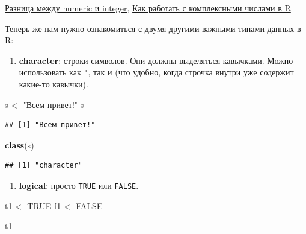 \documentclass[]{book}
\newenvironment{Shaded}{\begin{snugshade}}{\end{snugshade}}
\newcommand{\KeywordTok}[1]{\textcolor[rgb]{0.13,0.29,0.53}{\textbf{#1}}}
\newcommand{\StringTok}[1]{\textcolor[rgb]{0.31,0.60,0.02}{#1}}
\newcommand{\OtherTok}[1]{\textcolor[rgb]{0.56,0.35,0.01}{#1}}
\newcommand{\NormalTok}[1]{#1}
\providecommand{\tightlist}{%
  \setlength{\itemsep}{0pt}\setlength{\parskip}{0pt}}
\begin{document}
\href{https://stackoverflow.com/questions/23660094/whats-the-difference-between-integer-class-and-numeric-class-in-r}{Разница
между numeric и integer},
\href{http://www.r-tutor.com/r-introduction/basic-data-types/complex}{Как
работать с комплексными числами в R}

Теперь же нам нужно ознакомиться с двумя другими важными типами данных в
R:

\begin{enumerate}
\def\labelenumi{\arabic{enumi}.}
\tightlist
\item
  \textbf{character}: строки символов. Они должны выделяться кавычками.
  Можно использовать как \texttt{"}, так и \texttt{\textquotesingle{}}
  (что удобно, когда строчка внутри уже содержит какие-то кавычки).
\end{enumerate}

\begin{Shaded}
\begin{Highlighting}[]
\NormalTok{s <-}\StringTok{ "Всем привет!"}
\NormalTok{s}
\end{Highlighting}
\end{Shaded}

\begin{verbatim}
## [1] "Всем привет!"
\end{verbatim}

\begin{Shaded}
\begin{Highlighting}[]
\KeywordTok{class}\NormalTok{(s)}
\end{Highlighting}
\end{Shaded}

\begin{verbatim}
## [1] "character"
\end{verbatim}

\begin{enumerate}
\def\labelenumi{\arabic{enumi}.}
\setcounter{enumi}{1}
\tightlist
\item
  \textbf{logical}: просто \texttt{TRUE} или \texttt{FALSE}.
\end{enumerate}

\begin{Shaded}
\begin{Highlighting}[]
\NormalTok{t1 <-}\StringTok{ }\OtherTok{TRUE}
\NormalTok{f1 <-}\StringTok{ }\OtherTok{FALSE}

\NormalTok{t1}
\end{Highlighting}
\end{Shaded}
\end{document}
